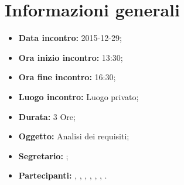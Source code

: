 \newpage
\section{Informazioni generali}
\begin{itemize}
\item \textbf{Data incontro:} 2015-12-29;
\item \textbf{Ora inizio incontro:} 13:30;
\item \textbf{Ora fine incontro:} 16:30;
\item \textbf{Luogo incontro:} Luogo privato;
\item \textbf{Durata:} 3 Ore;
\item \textbf{Oggetto:} Analisi dei requisiti;
\item \textbf{Segretario:} \GN;
\item \textbf{Partecipanti:} \AF, \FB, \GN, \GR, \MV, \MP, \SM.

\end{itemize}
